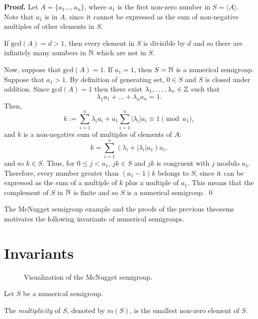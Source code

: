 \textbf{Proof. } Let $A = \{a_{1} \ldots, a_{n}\}$, where $a_1$ is the first non-zero number in $S = \langle A \rangle$. Note that $a_1$ is in $A$, since it cannot be expressed as the sum of non-negative multiples of other elements in $S$. \par
If $\mathrm{gcd}(A) = d > 1$, then every element in $S$ is divisible by $d$ and so there are infinitely many numbers in $\mathbb{N}$ which are not in $S$. \par
Now, suppose that $\mathrm{gcd}(A) = 1$. If $a_1 = 1$, then $S = \mathbb{N}$ is a numerical semigroup. Suppose that $a_1 > 1$. By definition of generating set, $0 \in S$ and $S$ is closed under addition. Since $\mathrm{gcd}(A) = 1$ then there exist $\lambda_1, \ldots, \lambda_n \in \mathbb{Z}$ such that 
\[\lambda_1a_1 + \ldots + \lambda_na_n = 1.\]
Then, 
\[
    k := \sum_{i = 1}^n \lambda_ia_i + a_1\sum_{i = 1}^n|\lambda_i|a_i \equiv 1 \pmod{a_1},
\]
and $k$ is a non-negative sum of multiples of elements of $A$: 
\[k = \sum_{i = 1}^n (\lambda_i + |\lambda_i|a_1)a_i,\]
and so $k \in S$. Thus, for $0 \leq j < a_1$, $jk \in S$ and $jk$ is congruent with $j$ modulo $a_1$. Therefore, every number greater than $(a_1 - 1)k$ belongs to $S$, since it can be expressed as the sum of a multiple of $k$ plus a multiple of $a_1$.  This means that the complement of $S$ in $\mathbb{N}$ is finite and so $S$ is a numerical semigroup. \qed \par

The McNugget semigroup example and the proofs of the previous theorems motivates the following invariants of numerical semigroups. \par 

\section{Invariants}\label{sec:smgps:invariants}

\begin{figure}
    \centering
    
    \caption{Visualization of the McNugget semigroup.}
    \label{fig:smgps:mcnugget}
\end{figure}

Let $S$ be a numerical semigroup. \par

\begin{definition}\label{def:smgps:multiplicity}
    The \textit{multiplicity} of $S$, denoted by $m(S)$, is the smallest non-zero element of $S$.
\end{definition}

